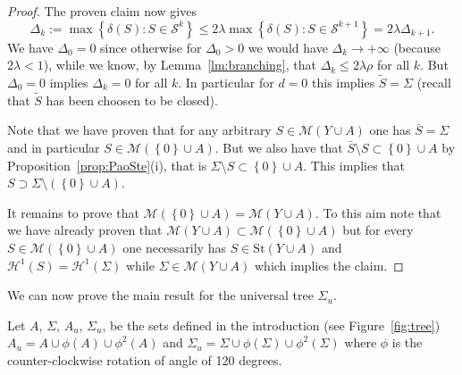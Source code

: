 \documentclass{amsart}
\renewcommand{\H}{\mathcal H}
\newcommand{\ENCLOSE}[1]{\left\{#1\right\}}
\newcommand{\St}{\mathrm{St}}
\newcommand{\M}{\mathcal{M}}
\renewcommand{\H}{\mathcal{H}}
\renewcommand{\S}{\mathcal{S}}
\theoremstyle{definition}
\theoremstyle{remark}
\begin{document}
\begin{proof}
The proven claim now gives 
\[
  \Delta_k 
  := \max\ENCLOSE{\delta(S)\colon S\in \S^k}
   \le 2\lambda \max\ENCLOSE{\delta(S)\colon S\in \S^{k+1}}
   = 2 \lambda \Delta_{k+1}.
\]
We have $\Delta_0 = 0$ since otherwise for 
$\Delta_0>0$ we would have 
$\Delta_k\to +\infty$ (because $2\lambda <1$), while we know,
by Lemma~\ref{lm:branching}, that $\Delta_k \le 2\lambda\rho$
for all $k$.
But $\Delta_0 =0$ implies $\Delta_k=0$ for all $k$.
In particular for $d=0$ this implies $\tilde S=\Sigma$ 
(recall that $\tilde S$ has been choosen to be closed).

Note that we have proven that for any arbitrary $S\in \M(Y\cup A)$ 
one has $\bar S= \Sigma$ and in particular $S\in \M(\ENCLOSE 0 \cup A)$. 
But we also have that $\bar S \setminus S \subset \ENCLOSE{0}\cup A$
by Proposition~\ref{prop:PaoSte}(i),
that is $\Sigma\setminus S \subset \ENCLOSE 0 \cup A$.
This implies that $S\supset \Sigma\setminus(\ENCLOSE 0 \cup A)$.

It remains to prove that $\M(\ENCLOSE 0 \cup A) = \M(Y\cup A)$.
To this aim note that we have already proven 
that $\M(Y\cup A) \subset \M(\ENCLOSE 0 \cup A)$
but for every $S\in \M(\ENCLOSE 0 \cup A)$ one necessarily has 
$S\in \St(Y\cup A)$ and $\H^1(S)=\H^1(\Sigma)$ while
$\Sigma \in \M(Y\cup A)$ which implies the claim.

\end{proof}

We can now prove the main result for the universal tree $\Sigma_u$.

Let $A$, $\Sigma$, $A_u$, $\Sigma_u$, be the sets defined in the introduction
(see Figure~\ref{fig:tree})
$A_u = A \cup \phi(A)\cup \phi^2(A)$ and 
$\Sigma_u = \Sigma \cup \phi(\Sigma)\cup \phi^2(\Sigma)$
where $\phi$ is the counter-clockwise rotation of angle of 120 degrees.
\end{document}
